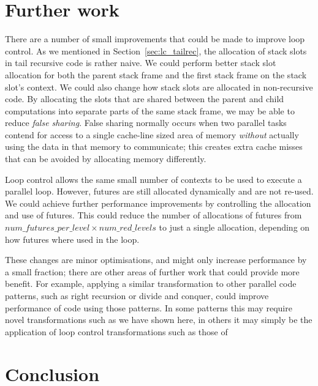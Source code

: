 \section{Further work}
\label{sec:lc_further_work}


There are a number of small improvements that could be made to improve loop
control.
As we mentioned in Section~\ref{sec:lc_tailrec},
the allocation of stack slots in tail recursive code is rather naive.
We could perform better stack slot allocation for both the parent stack
frame and the first stack frame on the stack slot's context.
We could also change how stack slots are allocated in non-recursive code.
By allocating the slots that are shared between the parent and child
computations into separate parts of the same stack frame,
we may be able to reduce \emph{false sharing}.
False sharing normally occurs when two parallel tasks contend for access to
a single cache-line sized area of memory \emph{without} actually using the
data in that memory to communicate;
this creates extra cache misses that can be avoided by allocating memory
differently.

Loop control allows the same small number of contexts to be used to execute
a parallel loop.
However, futures are still allocated dynamically and are not re-used.
We could achieve further performance improvements by controlling the
allocation and use of futures.
This could reduce the number of allocations of futures from
$num\_futures\_per\_level \times num\_red\_levels$ to just a single
allocation,
depending on how futures where used in the loop.

These changes are minor optimisations, and might only increase
performance by a small fraction;
there are other areas of further work that could provide more benefit.
For example,
applying a similar transformation to other parallel code patterns,
such as right recursion or divide and conquer,
could improve performance of code using those patterns.
In some patterns this may require novel transformations such as we have
shown here,
in others it may simply be the application of loop control transformations
such as those of \citet{shen_98_granularity-control}


\section{Conclusion}
\label{sec:lc_conc}


